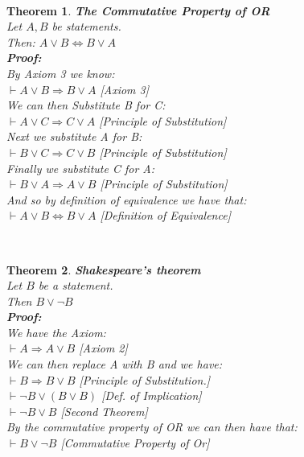 \documentclass[12pt]{extarticle}
\theoremstyle{plain}
\newtheorem{thm}{Theorem}[section]
\theoremstyle{plain}
\theoremstyle{plain}
\theoremstyle{Definition}
\theoremstyle{Definition}
\theoremstyle{plain}
\newcommand{\cut}[0]{\noindent\framebox[\linewidth]{\rule{\linewidth}{2pt}}\\}
\begin{document}
\cut
\begin{thm} \textbf{The Commutative Property of OR} \\
	Let $A,B$ be statements. \\
	Then: $A \lor B \Leftrightarrow B \lor A$ \\ 
	\textbf{Proof:} \\
	By Axiom 3 we know: \\ 
	$\vdash A \lor B \Rightarrow B \lor A$ \hfill [Axiom 3] \\
	We can then Substitute B for C: \\
	$\vdash A \lor C \Rightarrow C \lor A$ \hfill [Principle of Substitution] \\
	Next we substitute A for B: \\ 
	$\vdash B \lor C \Rightarrow C \lor B$ \hfill [Principle of Substitution] \\
	Finally we substitute C for A: \\ 
	$\vdash B \lor A \Rightarrow A \lor B$ \hfill [Principle of Substitution] \\
	And so by definition of equivalence we have that: \\
	$\vdash A \lor B \Leftrightarrow B \lor A$ \hfill [Definition of Equivalence]
\end{thm}
\cut
\begin{thm} \textbf{Shakespeare's theorem} \\ 
	Let $B$ be a statement. \\
	Then $B \lor \lnot B$ \\ 
	\textbf{Proof:} \\ 
	We have the Axiom: \\
	$\vdash A \Rightarrow A \lor B$ \hfill [Axiom 2] \\ 
	We can then replace A with B and  we have: \\ 
	$\vdash B \Rightarrow B \lor B$ \hfill [Principle of Substitution.] \\ 
	$\vdash \lnot B \lor (B \lor B)$ \hfill [Def. of Implication]\\ 
	$\vdash \lnot B \lor B$ \hfill [Second Theorem] \\ 
	By the commutative property of OR we can then have that: \\ 
	$\vdash B \lor \lnot B$ \hfill [Commutative Property of Or] 
\end{thm}
\cut
\end{document}

